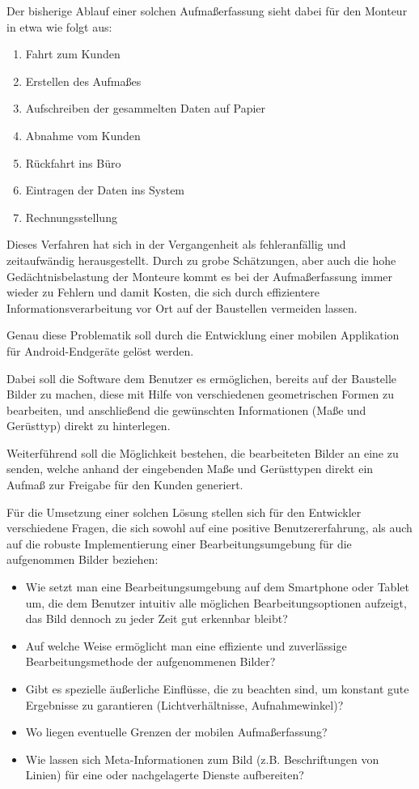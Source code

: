 Der bisherige Ablauf einer solchen Aufmaßerfassung sieht dabei für den Monteur in etwa wie folgt aus:

\begin{enumerate}
	\item Fahrt zum Kunden
	\item Erstellen des Aufmaßes
	\item Aufschreiben der gesammelten Daten auf Papier
	\item Abnahme vom Kunden
	\item Rückfahrt ins Büro
	\item Eintragen der Daten ins System
	\item Rechnungsstellung
\end{enumerate}

Dieses Verfahren hat sich in der Vergangenheit als fehleranfällig und zeitaufwändig herausgestellt. Durch zu grobe Schätzungen, aber auch die hohe Gedächtnisbelastung der Monteure kommt es bei der Aufmaßerfassung immer wieder zu Fehlern und damit Kosten, die sich durch effizientere Informationsverarbeitung vor Ort auf der Baustellen vermeiden lassen. 


Genau diese Problematik soll durch die Entwicklung einer mobilen Applikation für Android-Endgeräte gelöst werden.

Dabei soll die Software dem Benutzer es ermöglichen, bereits auf der Baustelle Bilder zu machen, diese mit Hilfe von verschiedenen geometrischen Formen zu bearbeiten, und anschließend die gewünschten Informationen (Maße und Gerüsttyp) direkt zu hinterlegen.

Weiterführend soll die Möglichkeit bestehen, die bearbeiteten Bilder an eine  zu senden, welche anhand der eingebenden Maße und Gerüsttypen direkt ein Aufmaß zur Freigabe für den Kunden generiert.

Für die Umsetzung einer solchen Lösung stellen sich für den Entwickler verschiedene Fragen, die sich sowohl auf eine positive Benutzererfahrung, als auch auf die robuste Implementierung einer Bearbeitungsumgebung für die aufgenommen Bilder beziehen:

\begin{itemize}
	\item Wie setzt man eine Bearbeitungsumgebung auf dem Smartphone oder Tablet um, die dem Benutzer intuitiv alle möglichen Bearbeitungsoptionen aufzeigt, das Bild dennoch zu jeder Zeit gut erkennbar bleibt?
	\item Auf welche Weise ermöglicht man eine effiziente und zuverlässige Bearbeitungsmethode der aufgenommenen Bilder?
	\item Gibt es spezielle äußerliche Einflüsse, die zu beachten sind, um konstant gute Ergebnisse zu garantieren (Lichtverhältnisse, Aufnahmewinkel)?
	\item Wo liegen eventuelle Grenzen der mobilen Aufmaßerfassung?
	\item Wie lassen sich Meta-Informationen zum Bild (z.B. Beschriftungen von Linien) für eine  oder nachgelagerte Dienste aufbereiten?
\end{itemize}

